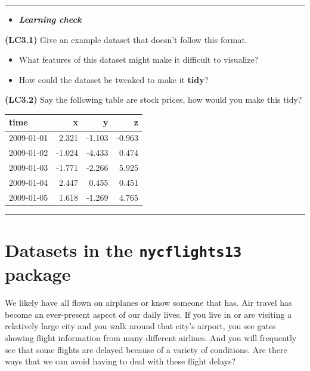 \documentclass[]{tufte-book}
\let\oldrule=\rule
\renewcommand{\rule}[1]{\oldrule{\linewidth}}
\providecommand{\tightlist}{%
  \setlength{\itemsep}{0pt}\setlength{\parskip}{0pt}}
\newenvironment{rmdblock}[1]
  {\begin{shaded*}
  \begin{itemize}
  \renewcommand{\labelitemi}{
    \raisebox{-.7\height}[0pt][0pt]{
    }
  }
  \item
  }
  {
  \end{itemize}
  \end{shaded*}
  }
\newenvironment{learncheck}
  {\begin{rmdblock}{warning}}
  {\end{rmdblock}}
\begin{document}
\begin{center}\rule{0.5\linewidth}{\linethickness}\end{center}

\begin{learncheck}
\textbf{\emph{Learning check}}
\end{learncheck}

\textbf{(LC3.1)} Give an example dataset that doesn't follow this
format.

\begin{itemize}
\tightlist
\item
  What features of this dataset might make it difficult to visualize?\\
\item
  How could the dataset be tweaked to make it \textbf{tidy}?
\end{itemize}

\textbf{(LC3.2)} Say the following table are stock prices, how would you
make this tidy?

\begin{tabular}{l|r|r|r}
\hline
time & x & y & z\\
\hline
2009-01-01 & 2.321 & -1.103 & -0.963\\
\hline
2009-01-02 & -1.024 & -4.433 & 0.474\\
\hline
2009-01-03 & -1.771 & -2.266 & 5.925\\
\hline
2009-01-04 & 2.447 & 0.455 & 0.451\\
\hline
2009-01-05 & 1.618 & -1.269 & 4.765\\
\hline
\end{tabular}

\begin{center}\rule{0.5\linewidth}{\linethickness}\end{center}

\section{\texorpdfstring{Datasets in the \texttt{nycflights13}
package}{Datasets in the nycflights13 package}}\label{datasets-in-the-nycflights13-package}

We likely have all flown on airplanes or know someone that has. Air
travel has become an ever-present aspect of our daily lives. If you live
in or are visiting a relatively large city and you walk around that
city's airport, you see gates showing flight information from many
different airlines. And you will frequently see that some flights are
delayed because of a variety of conditions. Are there ways that we can
avoid having to deal with these flight delays?
\end{document}
